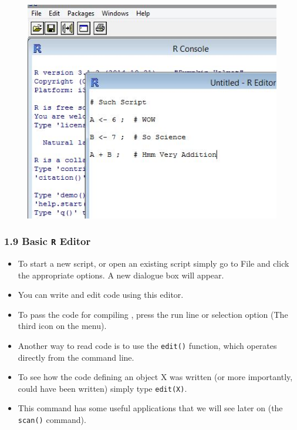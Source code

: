 \documentclass{beamer}
\begin{document}
 		\begin{frame}
 			\begin{figure}
 				\centering
 				\includegraphics[width=1.2\linewidth]{images/Rscript}         
 			\end{figure}
 		\end{frame}   
 	\begin{frame}
 		\frametitle{1.9 Basic \texttt{R} Editor}
 		\begin{itemize}
 		\item To start a new script, or open an existing script simply go to File and click the appropriate
 		options. A new dialogue box will appear. 
 		
 		\item You can write and edit code using this editor.
 		\item To pass the code for compiling , press the run line or selection option (The third icon
 		on the menu).
 		\end{itemize}
 	\end{frame}
 	\begin{frame}
 		
 		\begin{itemize}
 		\item Another way to read code is to use the \texttt{edit()} function, which operates directly from the
 		command line. 
 		\item To see how the code defining an object X was written (or more importantly,
 		could have been written) simply type \texttt{edit(X)}. 
 		\item This command has some useful applications
 		that we will see later on (the \texttt{scan()} command).
 		\end{itemize}
 		
 	\end{frame}
\end{document}
